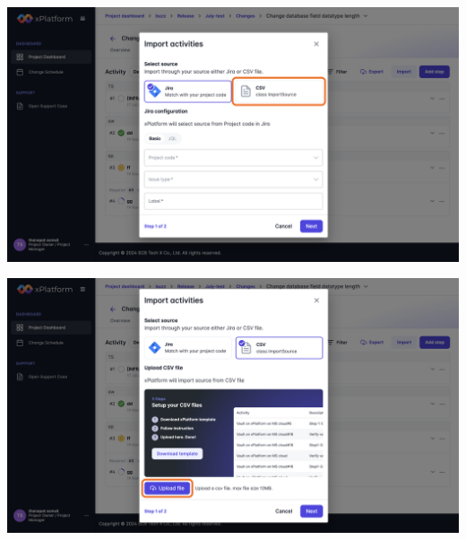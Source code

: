 \begin{center}
    \includegraphics[width=\linewidth]{resources/pages/change-runbook/import-csv/31.png}

    \vspace{1in}

    \includegraphics[width=\linewidth]{resources/pages/change-runbook/import-csv/32.png}
\end{center}

